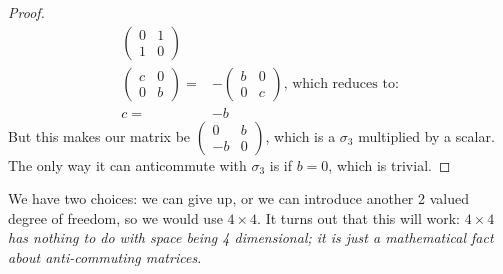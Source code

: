 \documentclass[]{article}
\begin{document}
\begin{proof}
\begin{align*}
\begin{pmatrix}
			0 & 1\\
			1 & 0
		\end{pmatrix}\\
		\begin{pmatrix}
			c & 0\\
			0 & b
		\end{pmatrix} =& - \begin{pmatrix}
			b & 0\\
			0 & c
		\end{pmatrix} \text{, which reduces to:}\\
		c =& -b
	\end{align*}
	But this makes our matrix be $\begin{pmatrix}
		0 & b\\
		-b & 0
	\end{pmatrix}$, which is a $\sigma_3$ multiplied by a scalar. The only way it can anticommute with $\sigma_3$ is if $b=0$, which is trivial.
\end{proof}
We have two choices: we can give up, or we can introduce another 2 valued degree of freedom, so we would use $4 \times 4$. It turns out that this will work: $4 \times 4$ \emph{has nothing to do with space being 4 dimensional; it is just a mathematical fact about anti-commuting matrices.} 
\end{document}
